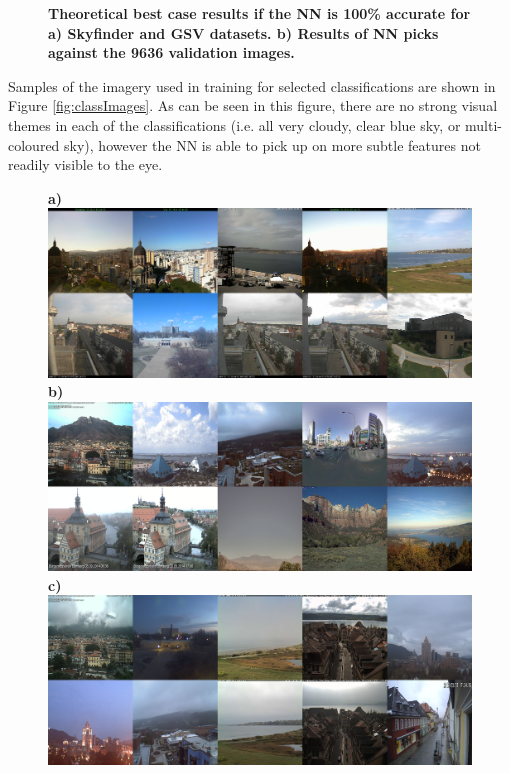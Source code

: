 \documentclass[final,3p,times,authoryear]{elsarticle}
\begin{document}
\begin{figure}
\caption{\textbf{
Theoretical best case results if the NN is 100\% accurate for a) Skyfinder and GSV datasets. b) Results of NN picks against the 9636 validation images.}}
\label{fig:errorplotscntk} \label{fig:errorplots}
\end{figure}

Samples of the imagery used in training for selected classifications are shown in Figure \ref{fig:classImages}. As can be seen in this figure, there are no strong visual themes in each of the classifications (i.e. all very cloudy, clear blue sky, or multi-coloured sky), however the NN is able to pick up on  more subtle features not readily visible to the eye. 

\begin{figure}
\centering
\textbf{a)}\includegraphics[trim = 0mm 0mm 0mm 0mm,clip,scale=0.14]{Images/13-0_Mean_7_8_300_tiles.png}
\textbf{b)}\includegraphics[trim = 0mm 0mm 0mm 0mm,clip,scale=0.14]{Images/13-3_Mean_7_6_100_tiles.png}
\textbf{c)}\includegraphics[trim = 0mm 0mm 0mm 0mm,clip,scale=0.14]{Images/13-5_K-mean_6_tiles.png}

\end{figure}
\end{document}
